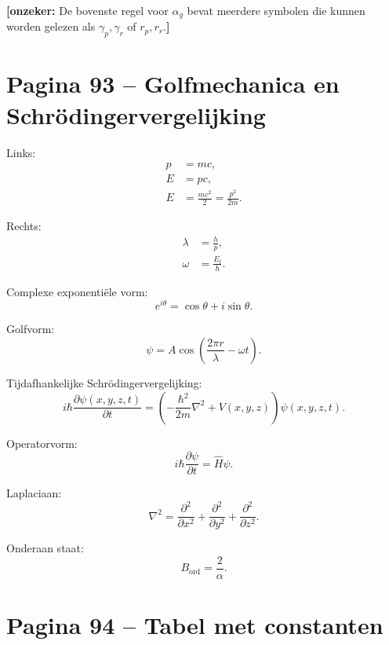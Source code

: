 \documentclass[11pt,a4paper]{article}
\newcommand{\onzeker}[1]{\ifmmode\text{\color{red!70!black}\bfseries[onzeker]}\else\textcolor{red!70!black}{\textbf{[onzeker:} #1\textbf{]}}\fi}
\begin{document}
\onzeker{De bovenste regel voor $\alpha_g$ bevat meerdere symbolen die kunnen worden gelezen als $\gamma_p,\gamma_r$ of $r_p,r_r$.}

\section*{Pagina 93 -- Golfmechanica en Schrödingervergelijking}

Links:
\begin{align*}
p &= mc,\\
E &= pc,\\
E &= \frac{mc^2}{2}=\frac{p^2}{2m}.
\end{align*}

Rechts:
\begin{align*}
\lambda &= \frac{h}{p},\\
\omega &= \frac{E_t}{\hbar}.
\end{align*}

Complexe exponentiële vorm:
\[
e^{i\theta}=\cos\theta+i\sin\theta.
\]

Golfvorm:
\[
\psi
=
A\cos\left(\frac{2\pi r}{\lambda}-\omega t\right).
\]

Tijdafhankelijke Schrödingervergelijking:
\[
i\hbar\frac{\partial \psi(x,y,z,t)}{\partial t}
=
\left(
-\frac{\hbar^2}{2m}\nabla^2
+
V(x,y,z)
\right)\psi(x,y,z,t).
\]

Operatorvorm:
\[
i\hbar\frac{\partial\psi}{\partial t}
=
\hat{H}\psi.
\]

Laplaciaan:
\[
\nabla^2
=
\frac{\partial^2}{\partial x^2}
+
\frac{\partial^2}{\partial y^2}
+
\frac{\partial^2}{\partial z^2}.
\]

Onderaan staat:
\[
B_{\mathrm{ord}}
=
\frac{2}{\alpha}.
\]

\section*{Pagina 94 -- Tabel met constanten}
\end{document}
